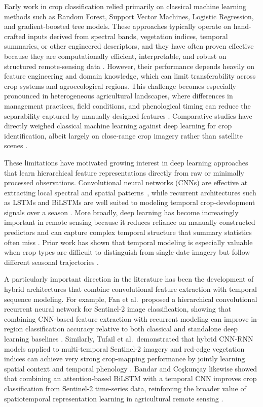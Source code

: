 \documentclass[pdflatex,sn-mathphys]{sn-jnl} %
\begin{document}
Early work in crop classification relied primarily on classical machine learning methods such as Random Forest, Support Vector Machines, Logistic Regression, and gradient-boosted tree models. These approaches typically operate on hand-crafted inputs derived from spectral bands, vegetation indices, temporal summaries, or other engineered descriptors, and they have often proven effective because they are computationally efficient, interpretable, and robust on structured remote-sensing data \cite{maxwell2019, belgiu2016, breiman2001, chen2016, ke2017}. However, their performance depends heavily on feature engineering and domain knowledge, which can limit transferability across crop systems and agroecological regions. This challenge becomes especially pronounced in heterogeneous agricultural landscapes, where differences in management practices, field conditions, and phenological timing can reduce the separability captured by manually designed features \cite{maxwell2019, wardlow2007towards, mahlayeye2024}. Comparative studies have directly weighed classical machine learning against deep learning for crop identification, albeit largely on close-range crop imagery rather than satellite scenes \cite{kuwait2023}.

These limitations have motivated growing interest in deep learning approaches that learn hierarchical feature representations directly from raw or minimally processed observations. Convolutional neural networks (CNNs) are effective at extracting local spectral and spatial patterns~\cite{cnn_multitemp}, while recurrent architectures such as LSTMs and BiLSTMs are well suited to modeling temporal crop-development signals over a season \cite{ieee2017, russwurm2018, bandar2024bilstm}. More broadly, deep learning has become increasingly important in remote sensing because it reduces reliance on manually constructed predictors and can capture complex temporal structure that summary statistics often miss \cite{zhu2017, tempcnn2019}. Prior work has shown that temporal modeling is especially valuable when crop types are difficult to distinguish from single-date imagery but follow different seasonal trajectories \cite{russwurm2018, wardlow2007towards}.

A particularly important direction in the literature has been the development of hybrid architectures that combine convolutional feature extraction with temporal sequence modeling. For example, Fan et al.\ proposed a hierarchical convolutional recurrent neural network for Sentinel-2 image classification, showing that combining CNN-based feature extraction with recurrent modeling can improve in-region classification accuracy relative to both classical and standalone deep learning baselines \cite{fan2023hcrnn}. Similarly, Tufail et al.\ demonstrated that hybrid CNN-RNN models applied to multi-temporal Sentinel-2 imagery and red-edge vegetation indices can achieve very strong crop-mapping performance by jointly learning spatial context and temporal phenology \cite{tufail2025cnnrnn}. Bandar and Co\c{s}kun\c{c}ay likewise showed that combining an attention-based BiLSTM with a temporal CNN improves crop classification from Sentinel-2 time-series data, reinforcing the broader value of spatiotemporal representation learning in agricultural remote sensing \cite{bandar2024bilstm}.
\end{document}
